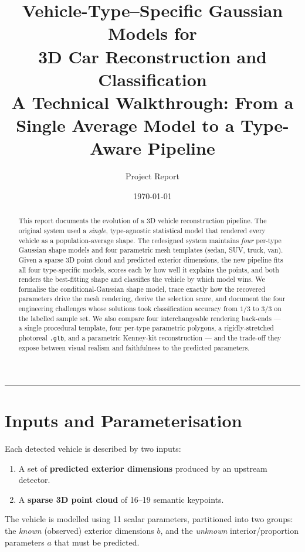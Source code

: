 \documentclass[11pt]{article}
\title{\textbf{Vehicle-Type--Specific Gaussian Models for\\ 3D Car Reconstruction and Classification}\\[4pt]
\large A Technical Walkthrough: From a Single Average Model to a Type-Aware Pipeline}
\author{Project Report}
\date{\today}
\theoremstyle{definition}
\begin{document}
\maketitle

\begin{abstract}
\noindent This report documents the evolution of a 3D vehicle reconstruction pipeline. The original system used a \emph{single}, type-agnostic statistical model that rendered every vehicle as a population-average shape. The redesigned system maintains \emph{four} per-type Gaussian shape models and four parametric mesh templates (sedan, SUV, truck, van). Given a sparse 3D point cloud and predicted exterior dimensions, the new pipeline fits all four type-specific models, scores each by how well it explains the points, and both renders the best-fitting shape and classifies the vehicle by which model wins. We formalise the conditional-Gaussian shape model, trace exactly how the recovered parameters drive the mesh rendering, derive the selection score, and document the four engineering challenges whose solutions took classification accuracy from $1/3$ to $3/3$ on the labelled sample set. We also compare four interchangeable rendering back-ends --- a single procedural template, four per-type parametric polygons, a rigidly-stretched photoreal \texttt{.glb}, and a parametric Kenney-kit reconstruction --- and the trade-off they expose between visual realism and faithfulness to the predicted parameters.
\end{abstract}

\tableofcontents
\vspace{1em}
\hrule
\vspace{1em}

\section{Inputs and Parameterisation}

Each detected vehicle is described by two inputs:
\begin{enumerate}[leftmargin=2em]
    \item A set of \textbf{predicted exterior dimensions} produced by an upstream detector.
    \item A \textbf{sparse 3D point cloud} of 16--19 semantic keypoints.
\end{enumerate}

The vehicle is modelled using 11 scalar parameters, partitioned into two groups: the \emph{known} (observed) exterior dimensions $b$, and the \emph{unknown} interior/proportion parameters $a$ that must be predicted.
\end{document}

